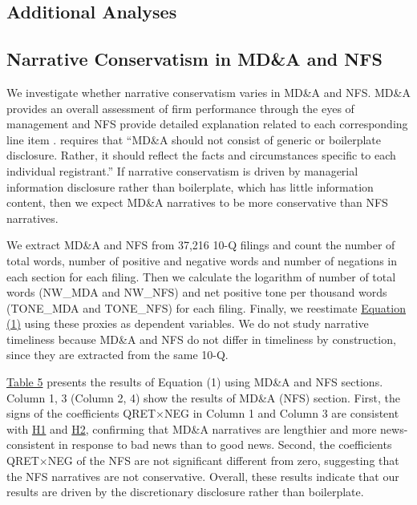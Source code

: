 \documentclass[letterpaper,11pt]{article}
\begin{document}
\begin{spacing}{1.5}
\section{Additional Analyses}
\subsection{Narrative Conservatism in MD\&A and NFS}
\noindent We investigate whether narrative conservatism varies in MD\&A and NFS. MD\&A provides an overall assessment of firm performance through the eyes of management and NFS provide detailed explanation related to each corresponding line item \cite{fasbConceptualFrameworkFinancial2018a, secFinancialReportingManual2019}.  requires that ``MD\&A should not consist of generic or boilerplate disclosure. Rather, it should reflect the facts and circumstances specific to each individual registrant.'' If narrative conservatism is driven by managerial information disclosure rather than boilerplate, which has little information content, then we expect MD\&A narratives to be more conservative than NFS narratives.

We extract MD\&A and NFS from 37,216 10-Q filings and count the number of total words, number of positive and negative words and number of negations in each section for each filing. Then we calculate the logarithm of number of total words (NW\_MDA and NW\_NFS) and net positive tone per thousand words (TONE\_MDA and TONE\_NFS) for each filing. Finally, we reestimate \hyperref[eq1]{Equation (1)} using these proxies as dependent variables. We do not study narrative timeliness because MD\&A and NFS do not differ in timeliness by construction, since they are extracted from the same 10-Q.

\hyperref[T5]{Table 5} presents the results of Equation (1) using MD\&A and NFS sections. Column 1, 3 (Column 2, 4) show the results of MD\&A (NFS) section. First, the signs of the coefficients QRET$\times$NEG in Column 1 and Column 3 are consistent with \hyperref[h1]{H1} and \hyperref[h2]{H2}, confirming that MD\&A narratives are lengthier and more news-consistent in response to bad news than to good news. Second, the coefficients QRET$\times$NEG of the NFS are not significant different from zero, suggesting that the NFS narratives are not conservative. Overall, these results indicate that our results are driven by the discretionary disclosure rather than boilerplate.


\end{spacing}
\end{document}
